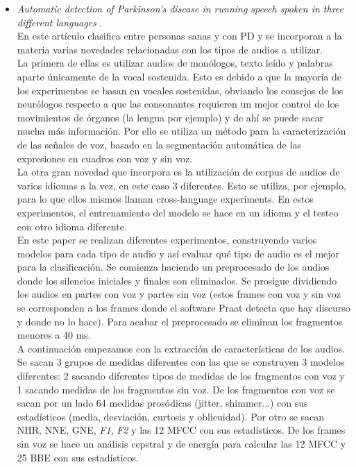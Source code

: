 \begin{itemize}
	\item \textit{Automatic detection of Parkinson’s disease in running speech spoken in three different languages} \cite{Orz2016}.\\
	En este artículo clasifica entre personas sanas y con PD y se incorporan a la materia varias novedades relacionadas con los tipos de audios a utilizar.\\ 
	La primera de ellas es utilizar audios de monólogos, texto leído y palabras aparte únicamente de la vocal sostenida. Esto es debido a que la mayoría de los experimentos se basan en vocales sostenidas, obviando los consejos de los neurólogos respecto a que las consonantes requieren un mejor control de los movimientos de órganos (la lengua por ejemplo) y de ahí se puede sacar mucha más información. Por ello se utiliza un método para la caracterización de las señales de voz, basado en la segmentación automática de las expresiones en cuadros con voz y sin voz.\\
	La otra gran novedad que incorpora es la utilización de corpus de audios de varios idiomas a la vez, en este caso 3 diferentes. Esto se utiliza, por ejemplo, para lo que ellos mismos llaman cross-language experiments. En estos experimentos, el entrenamiento del modelo se hace en un idioma y el testeo con otro idioma diferente.\\
	En este paper se realizan diferentes experimentos, construyendo varios modelos para cada tipo de audio y así evaluar qué tipo de audio es el mejor para la clasificación. Se comienza haciendo un preprocesado de los audios donde los silencios iniciales y finales son eliminados. Se prosigue dividiendo los audios en partes con voz y partes sin voz (estos frames con voz y sin voz se corresponden a los frames donde el software Praat \cite{praat} detecta que hay discurso y donde no lo hace). Para acabar el preprocesado se eliminan los fragmentos menores a 40 ms.\\ 
	A continuación empezamos con la extracción de características de los audios. Se sacan 3 grupos de medidas diferentes con las que se construyen 3 modelos diferentes: 2 sacando diferentes tipos de medidas de los fragmentos con voz y 1 sacando medidas de los fragmentos sin voz. De los fragmentos con voz se sacan por un lado 64 medidas prosódicas (jitter, shimmer...) con sus estadísticos (media, desviación, curtosis y oblicuidad). Por otro se sacan NHR, NNE, GNE, \textit{F1}, \textit{F2} y las 12 MFCC con sus estadísticos. De los frames sin voz se hace un análisis cepstral y de energía para calcular las 12 MFCC y 25 BBE con sus estadísticos. \\

\end{itemize}
